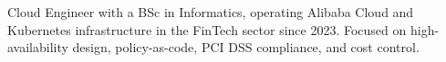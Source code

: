 

\begin{cvparagraph}

  Cloud Engineer with a BSc in Informatics, operating Alibaba Cloud and Kubernetes
  infrastructure in the FinTech sector since 2023. Focused on high-availability
  design, policy-as-code, PCI DSS compliance, and cost control.
\end{cvparagraph}
